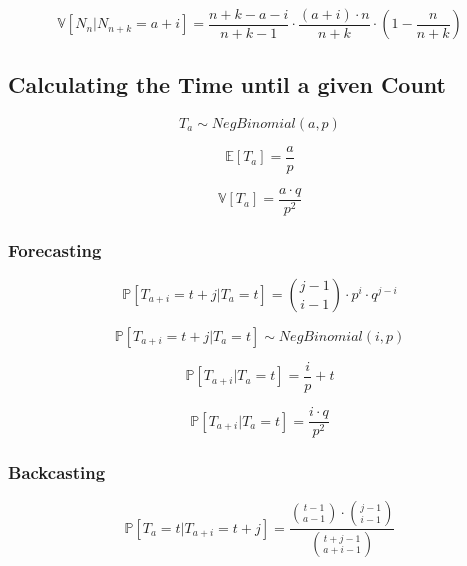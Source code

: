 \documentclass[12pt]{article}
\begin{document}
\begin{equation}
    \mathbb{V}[N_n | N_{n+k} = a + i] = 
    \frac{n + k - a - i}{n + k - 1} \cdot 
    \frac{(a + i) \cdot n}{ n + k} \cdot 
    ( 1 - \frac{n}{n + k})
\end{equation}

\subsection{Calculating the Time until a given Count}
\begin{equation}
    T_a \sim NegBinomial(a, p) 
\end{equation}

\begin{equation}
    \mathbb{E}[T_a] = \frac{a}{p}
\end{equation}

\begin{equation}
    \mathbb{V}[T_a] = \frac{a \cdot q}{p^2}
\end{equation}


\subsubsection{Forecasting}
\begin{equation}
    \mathbb{P}[T_{a + i} = t + j | T_a = t] =
    \binom{j-1}{i-1} \cdot p^i \cdot q^{j-i}
\end{equation}

\begin{equation}
    \mathbb{P}[T_{a + i} = t + j | T_a = t] \sim NegBinomial(i, p)
\end{equation}


\begin{equation}
    \mathbb{P}[T_{a + i} | T_a = t] = 
    \frac{i}{p} + t
\end{equation}

\begin{equation}
    \mathbb{P}[T_{a + i} | T_a = t] = 
    \frac{i \cdot q}{p^2}
\end{equation}

\subsubsection{Backcasting}
\begin{equation}
    \mathbb{P}[T_a = t | T_{a + i} = t + j] =
    \frac{
        \binom{t - 1}{a - 1} \cdot \binom{j - 1}{i - 1}
        }{
        \binom{t + j - 1}{a + i - 1}
    }
\end{equation}
\end{document}
